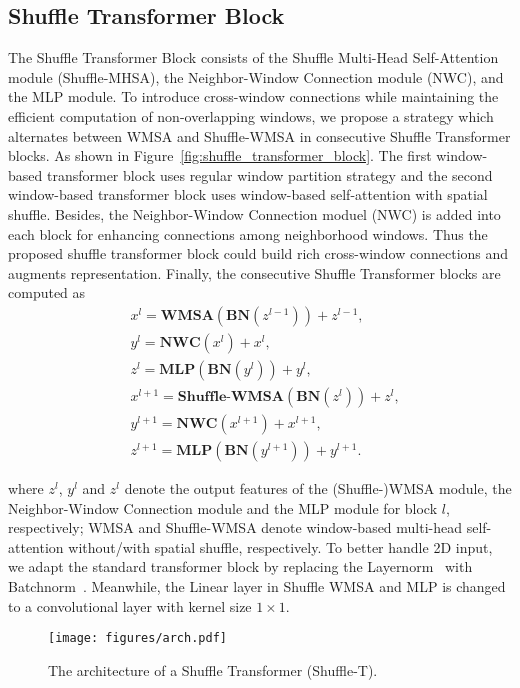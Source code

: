 \documentclass{article}
\begin{document}
\subsection{Shuffle Transformer Block}
The Shuffle Transformer Block consists of the Shuffle Multi-Head Self-Attention module (Shuffle-MHSA), the Neighbor-Window Connection module (NWC), and the MLP module.
To introduce cross-window connections while maintaining the efficient computation of non-overlapping windows, we propose a strategy which alternates between WMSA and Shuffle-WMSA in consecutive Shuffle Transformer blocks. As shown in Figure~\ref{fig:shuffle_transformer_block}. The first window-based transformer block uses regular window partition strategy and the second window-based transformer block uses window-based self-attention with spatial shuffle. Besides, the Neighbor-Window Connection moduel (NWC) is added into each block for enhancing connections among neighborhood windows. Thus the proposed shuffle transformer block could build rich cross-window connections and augments representation.  Finally, the consecutive Shuffle Transformer blocks are computed as
\begin{align*} \label{eq:optimizing}
& x^l=\textbf{WMSA}(\textbf{BN}(z^{l-1}))+z^{l-1}, \nonumber\\
& y^l=\textbf{NWC}(x^{l})+x^{l}, \nonumber\\
& z^l=\textbf{MLP}(\textbf{BN}(y^{l}))+y^{l}, \nonumber\\
& x^{l+1}=\textbf{Shuffle-WMSA}(\textbf{BN}(z^l))+z^l, \nonumber\\
& y^{l+1}=\textbf{NWC}(x^{l+1})+x^{l+1}, \nonumber\\
& z^{l+1}=\textbf{MLP}(\textbf{BN}(y^{l+1}))+y^{l+1}.
\end{align*}

where $z^l$, $y^l$ and $z^l$ denote the output features of the (Shuffle-)WMSA module, the Neighbor-Window Connection module and the MLP module for block $l$, respectively; WMSA and Shuffle-WMSA denote window-based multi-head self-attention without/with spatial shuffle, respectively. To better handle 2D input, we adapt the standard transformer block by replacing the Layernorm~\cite{ba2016layer} with Batchnorm~\cite{ioffe2015batch}. Meanwhile, the Linear layer in Shuffle WMSA and MLP is changed to a convolutional layer with kernel size $1\times1$.

\begin{figure*}[!t]
    \centering
    \texttt{[image: figures/arch.pdf]}
    \caption{The architecture of a Shuffle Transformer (Shuffle-T).}
    \label{fig:shuffle_transformer}
    \vspace{0mm}
\end{figure*}
\end{document}
